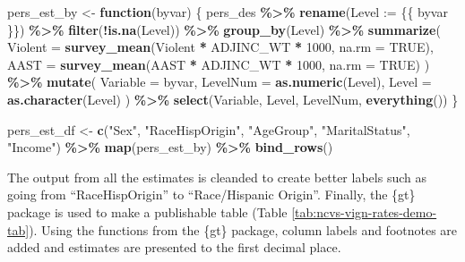 \documentclass[
]{krantz}
\makeatletter
\newenvironment{Shaded}{\begin{snugshade}}{\end{snugshade}}
\newcommand{\AttributeTok}[1]{\textcolor[rgb]{0.27,0.27,0.27}{#1}}
\newcommand{\ConstantTok}[1]{\textcolor[rgb]{0.37,0.37,0.37}{#1}}
\newcommand{\ControlFlowTok}[1]{\textcolor[rgb]{0.27,0.27,0.27}{\textbf{#1}}}
\newcommand{\DecValTok}[1]{\textcolor[rgb]{0.06,0.06,0.06}{#1}}
\newcommand{\FunctionTok}[1]{\textcolor[rgb]{0.27,0.27,0.27}{\textbf{#1}}}
\newcommand{\NormalTok}[1]{#1}
\newcommand{\OtherTok}[1]{\textcolor[rgb]{0.37,0.37,0.37}{#1}}
\newcommand{\SpecialCharTok}[1]{\textcolor[rgb]{0.43,0.43,0.43}{\textbf{#1}}}
\newcommand{\StringTok}[1]{\textcolor[rgb]{0.5,0.5,0.5}{#1}}
\newenvironment{kframe}{%
\medskip{}
\setlength{\fboxsep}{.8em}
 \def\at@end@of@kframe{}%
 \ifinner\ifhmode%
  \def\at@end@of@kframe{\end{minipage}}%
  \begin{minipage}{\columnwidth}%
 \fi\fi%
 \def\FrameCommand##1{\hskip\@totalleftmargin \hskip-\fboxsep
 \colorbox{shadecolor}{##1}\hskip-\fboxsep
     \hskip-\linewidth \hskip-\@totalleftmargin \hskip\columnwidth}%
 \MakeFramed {\advance\hsize-\width
   \@totalleftmargin\z@ \linewidth\hsize
   \@setminipage}}%
 {\par\unskip\endMakeFramed%
 \at@end@of@kframe}
\renewenvironment{Shaded}{\begin{kframe}}{\end{kframe}}
\makeatother
\begin{document}
\begin{Shaded}
\begin{Highlighting}[]
\NormalTok{pers\_est\_by }\OtherTok{\textless{}{-}} \ControlFlowTok{function}\NormalTok{(byvar) \{}
\NormalTok{  pers\_des }\SpecialCharTok{\%\textgreater{}\%}
    \FunctionTok{rename}\NormalTok{(}\AttributeTok{Level :=}\NormalTok{ \{\{ byvar \}\}) }\SpecialCharTok{\%\textgreater{}\%}
    \FunctionTok{filter}\NormalTok{(}\SpecialCharTok{!}\FunctionTok{is.na}\NormalTok{(Level)) }\SpecialCharTok{\%\textgreater{}\%}
    \FunctionTok{group\_by}\NormalTok{(Level) }\SpecialCharTok{\%\textgreater{}\%}
    \FunctionTok{summarize}\NormalTok{(}
      \AttributeTok{Violent =} \FunctionTok{survey\_mean}\NormalTok{(Violent }\SpecialCharTok{*}\NormalTok{ ADJINC\_WT }\SpecialCharTok{*} \DecValTok{1000}\NormalTok{, }\AttributeTok{na.rm =} \ConstantTok{TRUE}\NormalTok{),}
      \AttributeTok{AAST =} \FunctionTok{survey\_mean}\NormalTok{(AAST }\SpecialCharTok{*}\NormalTok{ ADJINC\_WT }\SpecialCharTok{*} \DecValTok{1000}\NormalTok{, }\AttributeTok{na.rm =} \ConstantTok{TRUE}\NormalTok{)}
\NormalTok{    ) }\SpecialCharTok{\%\textgreater{}\%}
    \FunctionTok{mutate}\NormalTok{(}
      \AttributeTok{Variable =}\NormalTok{ byvar,}
      \AttributeTok{LevelNum =} \FunctionTok{as.numeric}\NormalTok{(Level),}
      \AttributeTok{Level =} \FunctionTok{as.character}\NormalTok{(Level)}
\NormalTok{    ) }\SpecialCharTok{\%\textgreater{}\%}
    \FunctionTok{select}\NormalTok{(Variable, Level, LevelNum, }\FunctionTok{everything}\NormalTok{())}
\NormalTok{\}}

\NormalTok{pers\_est\_df }\OtherTok{\textless{}{-}}
  \FunctionTok{c}\NormalTok{(}\StringTok{"Sex"}\NormalTok{, }\StringTok{"RaceHispOrigin"}\NormalTok{, }\StringTok{"AgeGroup"}\NormalTok{, }\StringTok{"MaritalStatus"}\NormalTok{, }\StringTok{"Income"}\NormalTok{) }\SpecialCharTok{\%\textgreater{}\%}
  \FunctionTok{map}\NormalTok{(pers\_est\_by) }\SpecialCharTok{\%\textgreater{}\%}
  \FunctionTok{bind\_rows}\NormalTok{()}
\end{Highlighting}
\end{Shaded}

The output from all the estimates is cleanded to create better labels such as going from ``RaceHispOrigin'' to ``Race/Hispanic Origin''. Finally, the \{gt\} package is used to make a publishable table (Table \ref{tab:ncvs-vign-rates-demo-tab}). Using the functions from the \{gt\} package, column labels and footnotes are added and estimates are presented to the first decimal place.
\end{document}
